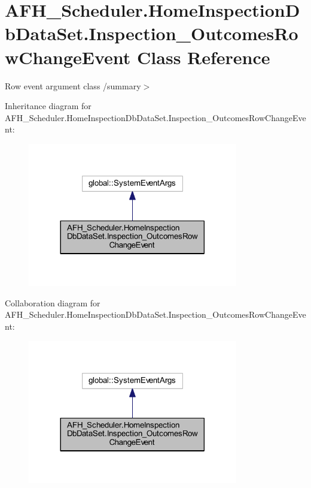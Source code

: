 \section{A\+F\+H\+\_\+\+Scheduler.\+Home\+Inspection\+Db\+Data\+Set.\+Inspection\+\_\+\+Outcomes\+Row\+Change\+Event Class Reference}
\label{class_a_f_h___scheduler_1_1_home_inspection_db_data_set_1_1_inspection___outcomes_row_change_event}


Row event argument class /summary$>$  




Inheritance diagram for A\+F\+H\+\_\+\+Scheduler.\+Home\+Inspection\+Db\+Data\+Set.\+Inspection\+\_\+\+Outcomes\+Row\+Change\+Event\+:
\nopagebreak
\begin{figure}[H]
\begin{center}
\leavevmode
\includegraphics[width=260pt]{class_a_f_h___scheduler_1_1_home_inspection_db_data_set_1_1_inspection___outcomes_row_change_event__inherit__graph}
\end{center}
\end{figure}


Collaboration diagram for A\+F\+H\+\_\+\+Scheduler.\+Home\+Inspection\+Db\+Data\+Set.\+Inspection\+\_\+\+Outcomes\+Row\+Change\+Event\+:
\nopagebreak
\begin{figure}[H]
\begin{center}
\leavevmode
\includegraphics[width=260pt]{class_a_f_h___scheduler_1_1_home_inspection_db_data_set_1_1_inspection___outcomes_row_change_event__coll__graph}
\end{center}
\end{figure}
